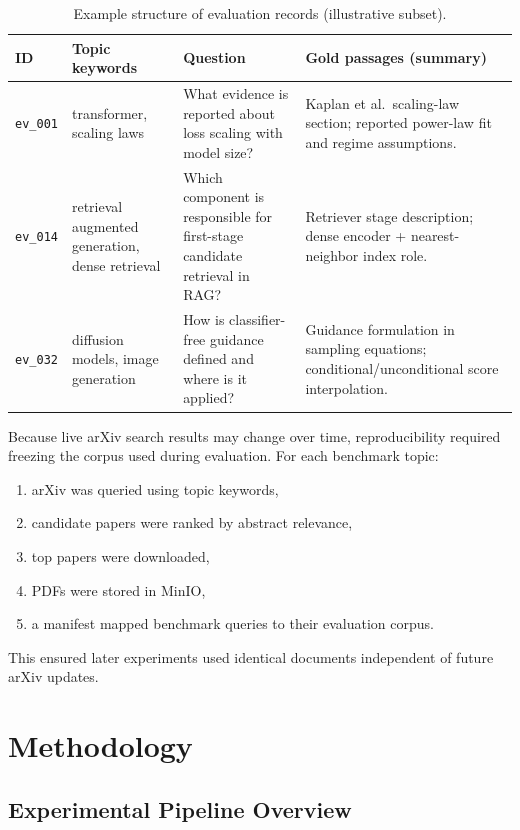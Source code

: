 \documentclass[a4paper,12pt]{article}
\begin{document}
\begin{table}[htbp]
\centering
\caption{Example structure of evaluation records (illustrative subset).}
\small
\setlength{\tabcolsep}{4pt}
\begin{tabular}{p{1.7cm}p{2.6cm}p{4.8cm}p{5.0cm}}
\toprule
ID & Topic keywords & Question & Gold passages (summary) \\
\midrule
\texttt{ev\_001} & transformer, scaling laws & What evidence is reported about loss scaling with model size? & Kaplan et al.\ scaling-law section; reported power-law fit and regime assumptions. \\
\texttt{ev\_014} & retrieval augmented generation, dense retrieval & Which component is responsible for first-stage candidate retrieval in RAG? & Retriever stage description; dense encoder + nearest-neighbor index role. \\
\texttt{ev\_032} & diffusion models, image generation & How is classifier-free guidance defined and where is it applied? & Guidance formulation in sampling equations; conditional/unconditional score interpolation. \\
\bottomrule
\end{tabular}
\end{table}

Because live arXiv search results may change over time, reproducibility required freezing the corpus used during evaluation. For each benchmark topic:

\begin{enumerate}
    \item arXiv was queried using topic keywords,
    \item candidate papers were ranked by abstract relevance,
    \item top papers were downloaded,
    \item PDFs were stored in MinIO,
    \item a manifest mapped benchmark queries to their evaluation corpus.
\end{enumerate}

This ensured later experiments used identical documents independent of future arXiv updates.

\newpage

\section{Methodology}

\subsection{Experimental Pipeline Overview}
\end{document}

